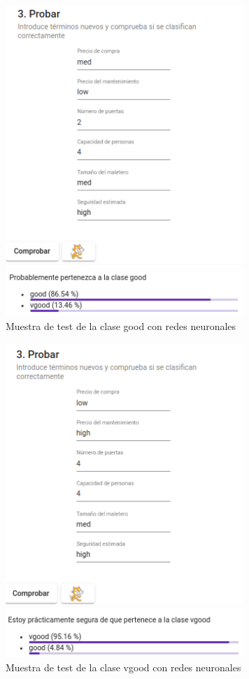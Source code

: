 \documentclass[a4paper, 12pt]{book}
\begin{document}
\begin{figure}
	\centering
	\includegraphics[width=9cm, keepaspectratio]{img/good_rn.png}
	\caption{Muestra de test de la clase good con redes neuronales} 	\label{fig:ejemplo20}
\end{figure}

\begin{figure}
	\centering
	\includegraphics[width=9cm, keepaspectratio]{img/vgood_rn.png}
	\caption{Muestra de test de la clase vgood con redes neuronales} 	
	\label{fig:ejemplo21}
\end{figure}
\end{document}
